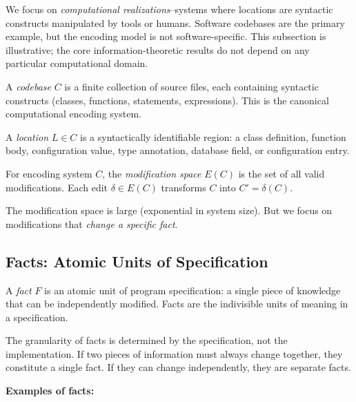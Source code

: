 We focus on \emph{computational realizations}--systems where locations are syntactic constructs manipulated by tools or humans. Software codebases are the primary example, but the encoding model is not software-specific. This subsection is illustrative; the core information-theoretic results do not depend on any particular computational domain.

\begin{definition}
A \emph{codebase} $C$ is a finite collection of source files, each containing syntactic constructs (classes, functions, statements, expressions). This is the canonical computational encoding system.
\end{definition}

\begin{definition}[Location]
A \emph{location} $L \in C$ is a syntactically identifiable region: a class definition, function body, configuration value, type annotation, database field, or configuration entry.
\end{definition}

\begin{definition}
For encoding system $C$, the \emph{modification space} $E(C)$ is the set of all valid modifications. Each edit $\delta \in E(C)$ transforms $C$ into $C' = \delta(C)$.
\end{definition}

The modification space is large (exponential in system size). But we focus on modifications that \emph{change a specific fact}.

\subsection{Facts: Atomic Units of Specification}\label{sec:facts}

\begin{definition}[Fact]\label{def:fact}
A \emph{fact} $F$ is an atomic unit of program specification: a single piece of knowledge that can be independently modified. Facts are the indivisible units of meaning in a specification.
\end{definition}

The granularity of facts is determined by the specification, not the implementation. If two pieces of information must always change together, they constitute a single fact. If they can change independently, they are separate facts.

\noindent\textbf{Examples of facts:}

